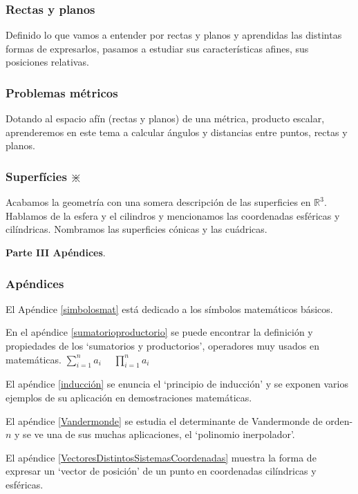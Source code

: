 \subsubsection{Rectas y planos}

Definido lo que vamos a entender por rectas y planos y aprendidas las distintas formas de expresarlos, pasamos a estudiar sus características afines, sus posiciones relativas.

\subsubsection{Problemas métricos}

Dotando al espacio afín (rectas y planos) de una métrica, producto escalar, aprenderemos en este tema a calcular ángulos y distancias entre puntos, rectas y planos.

\subsubsection{Superfícies $\divideontimes$}

Acabamos la geometría con una somera descripción de las superficies en $\mathbb R^3$. Hablamos de la esfera y el cilindros y mencionamos las coordenadas esféricas y cilíndricas. Nombramos las superficies cónicas y las cuádricas.

\vspace{5mm}
\Large {\textbf{Parte III  Apéndices}}\normalsize{.}

\subsubsection{Apéndices}

El Apéndice \ref{simbolosmat} está dedicado a los símbolos matemáticos básicos.

En el apéndice \ref{sumatorioproductorio} se puede encontrar la definición y propiedades de los `sumatorios y productorios', operadores muy usados en matemáticas.
$\displaystyle \sum_{i=1}^n a_i\; \quad \prod_{i=1}^n a_i$

El apéndice \ref{inducción} se enuncia el `principio de inducción' y se exponen varios ejemplos de su aplicación en demostraciones matemáticas.

El apéndice \ref{Vandermonde} se estudia el determinante de Vandermonde de orden-$n$ y se ve una de sus muchas aplicaciones, el `polinomio inerpolador'.


El apéndice \ref{VectoresDistintosSistemasCoordenadas} muestra la forma de expresar un `vector de posición' de un punto en coordenadas cilíndricas y esféricas.

